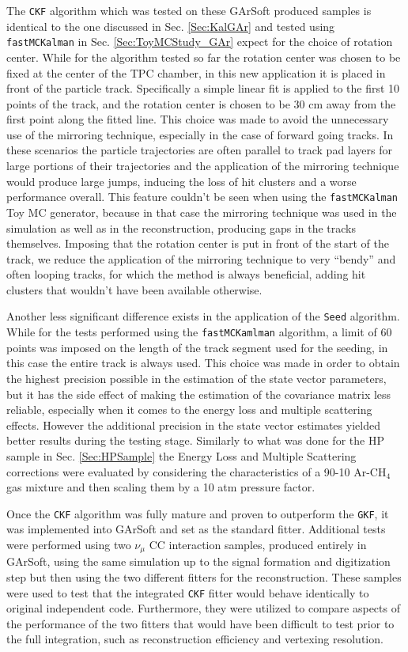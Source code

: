 The \texttt{CKF} algorithm which was tested on these GArSoft produced samples is identical to the one discussed in Sec. \ref{Sec:KalGAr} and tested using \texttt{fastMCKalman} in Sec. \ref{Sec:ToyMCStudy_GAr} expect for the choice of rotation center. While for the algorithm tested so far the rotation center was chosen to be fixed at the center of the TPC chamber, in this new application it is placed in front of the particle track. Specifically a simple linear fit is applied to the first 10 points of the track, and the rotation center is chosen to be 30 cm away from the first point along the fitted line. This choice was made to avoid the unnecessary use of the mirroring technique, especially in the case of forward going tracks. In these scenarios the particle trajectories are often parallel to track pad layers for large portions of their trajectories and the application of the mirroring technique would produce large jumps, inducing the loss of hit clusters and a worse performance overall. This feature couldn't be seen when using the \texttt{fastMCKalman} Toy MC generator, because in that case the mirroring technique was used in the simulation as well as in the reconstruction, producing gaps in the tracks themselves. Imposing that the rotation center is put in front of the start of the track, we reduce the application of the mirroring technique to very \enquote{bendy} and often looping tracks, for which the method is always beneficial, adding hit clusters that wouldn't have been available otherwise. 

Another less significant difference exists in the application of the \texttt{Seed} algorithm. While for the tests performed using the \texttt{fastMCKamlman} algorithm, a limit of 60 points was imposed on the length of the track segment used for the seeding, in this case the entire track is always used. This choice was made in order to obtain the highest precision possible in the estimation of the state vector parameters, but it has the side effect of making the estimation of the covariance matrix less reliable, especially when it comes to the energy loss and multiple scattering effects. However the additional precision in the state vector estimates yielded better results during the testing stage. Similarly to what was done for the HP sample in Sec. \ref{Sec:HPSample} the Energy Loss and Multiple Scattering corrections were evaluated by considering the characteristics of a 90-10 Ar-CH$_4$ gas mixture and then scaling them by a 10 atm pressure factor.

Once the \texttt{CKF} algorithm was fully mature and proven to outperform the \texttt{GKF}, it was implemented into GArSoft and set as the standard fitter. Additional tests were performed using two $\nu_\mu$ CC interaction samples, produced entirely in GArSoft, using the same simulation up to the signal formation and digitization step but then using the two different fitters for the reconstruction. These samples were used to test that the integrated \texttt{CKF} fitter would behave identically to original independent code. Furthermore, they were utilized to compare aspects of the performance of the two fitters that would have been difficult to test prior to the full integration, such as reconstruction efficiency and vertexing resolution. 

